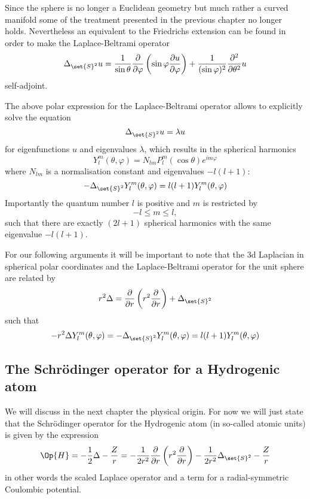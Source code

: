 Since the sphere is no longer a Euclidean geometry
but much rather a curved manifold some of the treatment presented
in the previous chapter no longer holds.
Nevertheless an equivalent to the Friedrichs extension can be found
in order to make the Laplace-Beltrami operator
\[ \Delta_{\set{S}^2} u = \frac{1}{\sin \theta} \frac{\partial}{\partial \varphi}
\left( \sin \varphi \frac{\partial u}{\partial \varphi}  \right)
+ \frac{1}{(\sin \varphi)^2} \frac{\partial^2}{\partial \theta^2} u\]
self-adjoint.

The above polar expression for the Laplace-Beltrami operator
allows to explicitly solve the equation
\newcommand{\laplaceSphere}{\Delta_{\set{S}^2}}
\[ \laplaceSphere u = \lambda u \]
for eigenfunctions $u$ and eigenvalues $\lambda$,
which results in the spherical harmonics
\[ Y_l^m(\theta, \varphi) = N_{lm} P_l^m(\cos \theta) e^{im\varphi} \]
where $N_{lm}$ is a normalisation constant
and eigenvalues $-l (l+1)$:
\begin{equation}
	-\laplaceSphere Y_l^m(\theta, \varphi) = l (l+1) Y_l^m(\theta, \varphi)
	\label{eqn:Laplace}
\end{equation}
Importantly the quantum number $l$ is positive and $m$ is restricted by
\[ -l \le m \le l, \]
such that there are exactly $(2l+1)$ spherical harmonics with the same eigenvalue
$-l (l+1)$.

For our following arguments it will be important to note
that the 3d Laplacian in spherical polar coordinates
and the Laplace-Beltrami operator for the unit sphere
are related by
\newcommand{\laplaceRadial}{\frac{\partial}{\partial r} \left( r^2 \frac{\partial}{\partial r} \right)}
\begin{equation}
r^2 \Delta = \laplaceRadial + \laplaceSphere
	\label{eqn:LaplaceCorrespondance}
\end{equation}
such that
\begin{equation}
	- r^2 \Delta Y_l^m(\theta, \varphi) = -\laplaceSphere Y_l^m(\theta, \varphi) = l (l+1) Y_l^m(\theta, \varphi)
	\label{eqn:LaplaceSphericalHarmonic}
\end{equation}


\subsection{The Schrödinger operator for a Hydrogenic atom}
\label{sec:HydrogenAtom}
We will discuss in the next chapter the physical origin.
For now we will just state that the Schrödinger operator for the Hydrogenic atom
(in so-called atomic units)
is given by the expression
\begin{equation}
	\Op{H} = - \frac12 \Delta - \frac{Z}{r} = -\frac{1}{2r^2} \laplaceRadial -\frac{1}{2r^2} \laplaceSphere - \frac{Z}{r}
	\label{eqn:HydrogenOperator}
\end{equation}
in other words the scaled Laplace operator and a term for a radial-symmetric Coulombic
potential.

